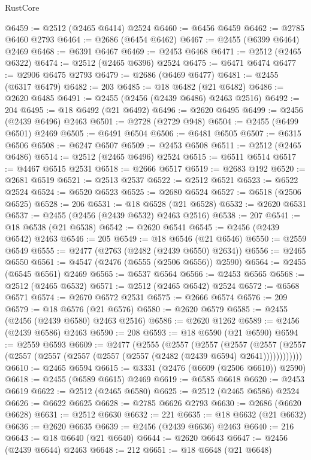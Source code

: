 \begin{lexlean}{RustCore}
\begin{coremodule}
@6459 := @2512 (@2465 @6414) @2524
@6460 := @6456 @6459
@6462 := @2785 @6460 @2793
@6464 := @2686 (@6454 @6462)
@6467 := @2455 (@6399 @6464) @2469
@6468 := @6391 @6467
@6469 := @2453 @6468
@6471 := @2512 (@2465 @6322)
@6474 := @2512 (@2465 @6396) @2524
@6475 := @6471 @6474
@6477 := @2906 @6475 @2793
@6479 := @2686 (@6469 @6477)
@6481 := @2455 (@6317 @6479)
@6482 := 203
@6485 := @18 @6482 (@21 @6482)
@6486 := @2620 @6485
@6491 := @2455 (@2456 (@2439 @6486) @2463 @2516)
@6492 := 204
@6495 := @18 @6492 (@21 @6492)
@6496 := @2620 @6495
@6499 := @2456 (@2439 @6496) @2463
@6501 := @2728 (@2729 @948)
@6504 := @2455 (@6499 @6501) @2469
@6505 := @6491 @6504
@6506 := @6481 @6505
@6507 := @6315 @6506
@6508 := @6247 @6507
@6509 := @2453 @6508
@6511 := @2512 (@2465 @6486)
@6514 := @2512 (@2465 @6496) @2524
@6515 := @6511 @6514
@6517 := @4467 @6515 @2531
@6518 := @2666 @6517
@6519 := @2683 @192
@6520 := @2681 @6519
@6521 := @2513 @2537
@6522 := @2512 @6521
@6523 := @6522 @2524
@6524 := @6520 @6523
@6525 := @2680 @6524
@6527 := @6518 (@2506 @6525)
@6528 := 206
@6531 := @18 @6528 (@21 @6528)
@6532 := @2620 @6531
@6537 := @2455 (@2456 (@2439 @6532) @2463 @2516)
@6538 := 207
@6541 := @18 @6538 (@21 @6538)
@6542 := @2620 @6541
@6545 := @2456 (@2439 @6542) @2463
@6546 := 205
@6549 := @18 @6546 (@21 @6546)
@6550 := @2559 @6549
@6555 := @2477 (@2763 (@2482 (@2439 @6550) @2634))
@6556 := @2465 @6550
@6561 := @4547 (@2476 (@6555 (@2506 @6556)) @2590)
@6564 := @2455 (@6545 @6561) @2469
@6565 := @6537 @6564
@6566 := @2453 @6565
@6568 := @2512 (@2465 @6532)
@6571 := @2512 (@2465 @6542) @2524
@6572 := @6568 @6571
@6574 := @2670 @6572 @2531
@6575 := @2666 @6574
@6576 := 209
@6579 := @18 @6576 (@21 @6576)
@6580 := @2620 @6579
@6585 := @2455 (@2456 (@2439 @6580) @2463 @2516)
@6586 := @2620 @1262
@6589 := @2456 (@2439 @6586) @2463
@6590 := 208
@6593 := @18 @6590 (@21 @6590)
@6594 := @2559 @6593
@6609 := @2477
    (@2555
      (@2557
        (@2557
          (@2557
            (@2557 (@2557 (@2557 (@2557 (@2557 (@2557 (@2557 (@2482 (@2439 @6594) @2641))))))))))))
@6610 := @2465 @6594
@6615 := @3331 (@2476 (@6609 (@2506 @6610)) @2590)
@6618 := @2455 (@6589 @6615) @2469
@6619 := @6585 @6618
@6620 := @2453 @6619
@6622 := @2512 (@2465 @6580)
@6625 := @2512 (@2465 @6586) @2524
@6626 := @6622 @6625
@6628 := @2785 @6626 @2793
@6630 := @2686 (@6620 @6628)
@6631 := @2512 @6630
@6632 := 221
@6635 := @18 @6632 (@21 @6632)
@6636 := @2620 @6635
@6639 := @2456 (@2439 @6636) @2463
@6640 := 216
@6643 := @18 @6640 (@21 @6640)
@6644 := @2620 @6643
@6647 := @2456 (@2439 @6644) @2463
@6648 := 212
@6651 := @18 @6648 (@21 @6648)

\end{coremodule}
\end{lexlean}
